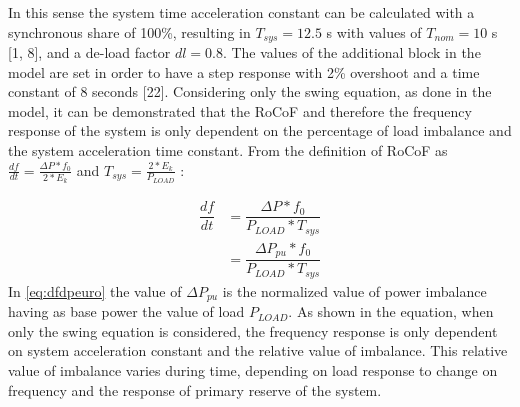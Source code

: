 In this sense the system time acceleration constant can be calculated with a synchronous share of 100\%, resulting in $ T_{sys}=12.5 $ s  with values of $ T_{nom}=10 $ s [1, 8], and a de-load factor $ dl=0.8 $.
The values of the additional block in the model are set in order to have a step response with 2\% overshoot and a time constant of 8 seconds [22].
Considering only the swing equation, as done in the model, it can be demonstrated that the RoCoF and therefore the frequency response of the system is only dependent on the percentage of load imbalance and the system acceleration time constant.
From the definition of RoCoF as $ \frac{df}{dt}=\frac{\Delta P*f_0}{2*E_k} $ and  $ T_{sys}=\frac{2*E_k}{P_{LOAD}} $ :

\begin{align}
	\dfrac{df}{dt} &=\dfrac{\Delta P*f_0}{P_{LOAD}*T_{sys}} \nonumber\\
	&=\dfrac{\Delta P_{pu}*f_0}{P_{LOAD}*T_{sys}}
	\label{eq:dfdpeuro}
\end{align}
In \eqref{eq:dfdpeuro} the value of $ \Delta P_{pu} $ is the normalized value of power imbalance having as base power the value of load $ P_{LOAD} $. As shown in the equation, when only the swing equation is considered, the frequency response is only dependent on system acceleration constant and the relative value of imbalance. This relative value of imbalance varies during time, depending on load response to change on frequency and the response of primary reserve of the system.


